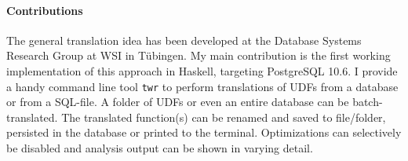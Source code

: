 



    
\paragraph*{Contributions} The general translation idea has been developed at the Database Systems Research Group at WSI in Tübingen. My main contribution is the first working implementation of this approach in Haskell, targeting PostgreSQL 10.6. I provide a handy command line tool \texttt{twr} to perform translations of UDFs from a database or from a SQL-file. A folder of UDFs or even an entire database can be batch-translated. The translated function(s) can be renamed and saved to file/folder, persisted in the database or printed to the terminal. Optimizations can selectively be disabled and analysis output can be shown in varying detail.

